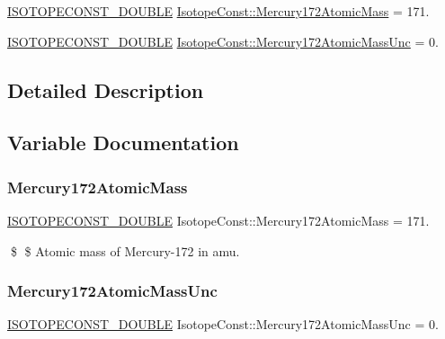\begin{DoxyCompactItemize}
\item 
\mbox{\hyperlink{group___isotope_const-_macros_ga8f45a7272ce02c0b4c65c44636ed719a}{I\+S\+O\+T\+O\+P\+E\+C\+O\+N\+S\+T\+\_\+\+D\+O\+U\+B\+LE}} \mbox{\hyperlink{group___isotope_const-_mercury-_hg172_ga73d729cc3e032592c60411e990dacf13}{Isotope\+Const\+::\+Mercury172\+Atomic\+Mass}} = 171.
\item 
\mbox{\hyperlink{group___isotope_const-_macros_ga8f45a7272ce02c0b4c65c44636ed719a}{I\+S\+O\+T\+O\+P\+E\+C\+O\+N\+S\+T\+\_\+\+D\+O\+U\+B\+LE}} \mbox{\hyperlink{group___isotope_const-_mercury-_hg172_ga99f9a3dfdccd040ceee526d6e2501c79}{Isotope\+Const\+::\+Mercury172\+Atomic\+Mass\+Unc}} = 0.
\end{DoxyCompactItemize}


\subsection{Detailed Description}


\subsection{Variable Documentation}
\mbox{\label{group___isotope_const-_mercury-_hg172_ga73d729cc3e032592c60411e990dacf13}} 
\subsubsection{\texorpdfstring{Mercury172\+Atomic\+Mass}{Mercury172AtomicMass}}
{\footnotesize\ttfamily \mbox{\hyperlink{group___isotope_const-_macros_ga8f45a7272ce02c0b4c65c44636ed719a}{I\+S\+O\+T\+O\+P\+E\+C\+O\+N\+S\+T\+\_\+\+D\+O\+U\+B\+LE}} Isotope\+Const\+::\+Mercury172\+Atomic\+Mass = 171.}

\$ \$ Atomic mass of Mercury-\/172 in amu. \mbox{\label{group___isotope_const-_mercury-_hg172_ga99f9a3dfdccd040ceee526d6e2501c79}} 
\subsubsection{\texorpdfstring{Mercury172\+Atomic\+Mass\+Unc}{Mercury172AtomicMassUnc}}
{\footnotesize\ttfamily \mbox{\hyperlink{group___isotope_const-_macros_ga8f45a7272ce02c0b4c65c44636ed719a}{I\+S\+O\+T\+O\+P\+E\+C\+O\+N\+S\+T\+\_\+\+D\+O\+U\+B\+LE}} Isotope\+Const\+::\+Mercury172\+Atomic\+Mass\+Unc = 0.}

